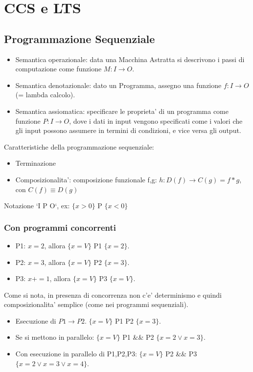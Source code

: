 \chapter{CCS e LTS}

\section{Programmazione Sequenziale}

\begin{itemize}
  \item Semantica operazionale: data una Macchina Astratta si descrivono i passi di computazione come funzione $M : I \rightarrow O$.
  \item Semantica denotazionale: dato un Programma, assegno una funzione $f : I \rightarrow O$ (= lambda calcolo).
  \item Semantica assiomatica: specificare le proprieta' di un programma come funzione $P : I \rightarrow O$, dove i dati in input vengono specificati come i valori che gli input possono assumere in termini di condizioni, e vice versa gli output.
\end{itemize}

Caratteristiche della programmazione sequenziale:
\begin{itemize}
  \item Terminazione
  \item Composizionalita': composizione funzionale f,g: $h : D(f) \rightarrow C(g) = f * g$, con $C(f) \equiv D(g)$
\end{itemize}

Notazione `I P O`, ex: $\{x>0\}$ P $\{x<0\}$

\subsection{Con programmi concorrenti}

\begin{itemize}
  \item P1: $x = 2$, allora $\{x = V\}$ P1 $\{x = 2\}$.
  \item P2: $x = 3$, allora $\{x = V\}$ P2 $\{x = 3\}$.
  \item P3: $x += 1$, allora $\{x = V\}$ P3 $\{x = V\}$.
\end{itemize}

Come si nota, in presenza di concorrenza non c'e' determinismo e quindi composizionalita' semplice (come nei programmi sequenziali).

\begin{itemize}
  \item Esecuzione di $P1 \rightarrow P2$. $\{x = V\}$ P1 P2 $\{x = 3\}$.
  \item Se si mettono in parallelo: $\{x = V\}$ P1 \&\& P2 $\{x = 2 \lor x = 3\}$.
  \item Con esecuzione in parallelo di P1,P2,P3: $\{x = V\}$ P2 \&\& P3 $\{x = 2 \lor x = 3 \lor x = 4\}$.
\end{itemize}

